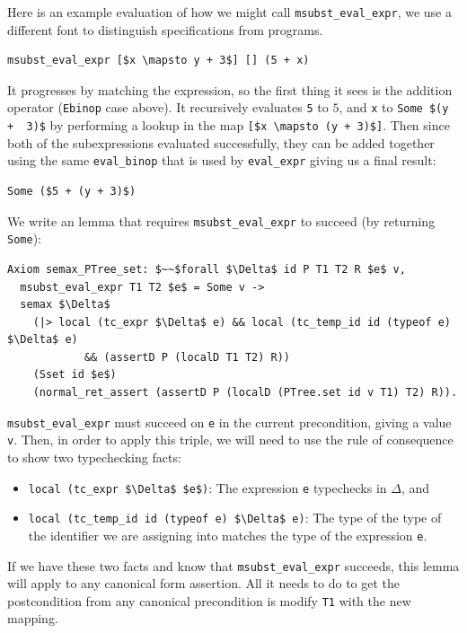 \documentclass{puthesis}
\begin{document}
Here is an example evaluation of how we might call
\lstinline|msubst_eval_expr|, we use a different font to distinguish
specifications from programs.

\begin{lstlisting}
msubst_eval_expr [$x \mapsto y + 3$] [] (5 + x)
\end{lstlisting}

It progresses by matching the expression, so the first thing it sees
is the addition operator (\lstinline|Ebinop| case above). It
recursively evaluates \lstinline|5| to $5$,
and \lstinline|x| to \lstinline|Some $(y +  3)$| by performing a lookup in the map
\lstinline|[$x \mapsto (y + 3)$]|. Then since both of the subexpressions
evaluated successfully, they can be added together using the same
\lstinline|eval_binop| that is used by \lstinline|eval_expr| giving us
a final result:

\begin{lstlisting}
Some ($5 + (y + 3)$)
\end{lstlisting}

We write an lemma that requires \lstinline|msubst_eval_expr| to succeed
(by returning \lstinline|Some|):

\begin{lstlisting}
Axiom semax_PTree_set: $~~$forall $\Delta$ id P T1 T2 R $e$ v,
  msubst_eval_expr T1 T2 $e$ = Some v ->
  semax $\Delta$
    (|> local (tc_expr $\Delta$ e) && local (tc_temp_id id (typeof e) $\Delta$ e) 
            && (assertD P (localD T1 T2) R))
    (Sset id $e$)
    (normal_ret_assert (assertD P (localD (PTree.set id v T1) T2) R)).
\end{lstlisting}

\lstinline|msubst_eval_expr| must succeed on \lstinline|e| in the
current precondition, giving a value \lstinline|v|. Then, in order to
apply this triple, we will need to use the rule of consequence to show
two typechecking facts:

\begin{itemize}
\item \lstinline|local (tc_expr $\Delta$ $e$)|: The expression \lstinline|e|
  typechecks in $\Delta$, and
\item \lstinline|local (tc_temp_id id (typeof e) $\Delta$ e)|: The type of
  the type of the identifier we are assigning into matches the type of
  the expression \lstinline|e|.
\end{itemize}

If we have these two facts and know that \lstinline|msubst_eval_expr|
succeeds, this lemma will apply to any canonical form assertion. All
it needs to do to get the postcondition from any canonical
precondition is modify \lstinline|T1| with the new mapping.
\end{document}
